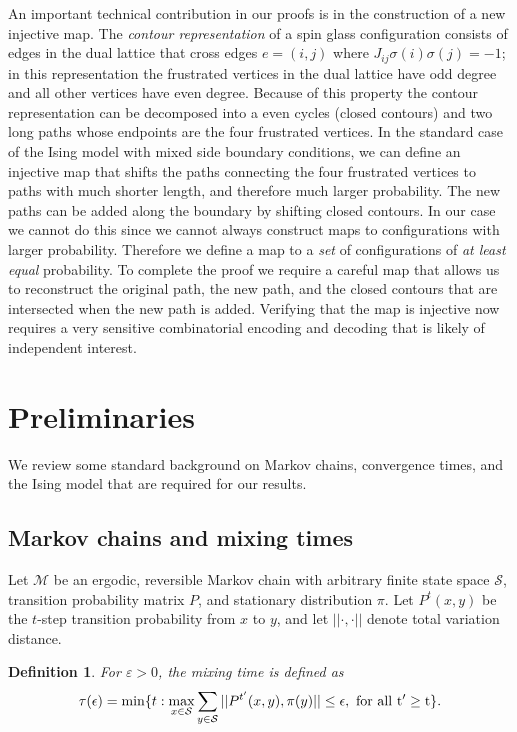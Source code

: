 \documentclass[letterpaper,english,numberwithinsect]{amsart}
\newtheorem{definition}{Definition}[section]
\newcommand{\cM}{\mathcal{M}}
\newcommand{\cS}{\mathcal{S}}
\begin{document}
An important technical contribution in our proofs is in the construction of a new injective map.  The {\it contour representation} of a spin glass configuration consists of edges in the dual lattice that cross  edges $e=(i,j)$ where $J_{ij} \sigma(i) \sigma(j) = -1$; in this representation the frustrated vertices in the dual lattice have odd degree and all other vertices have even degree. Because of this property the contour representation can be decomposed into a even cycles (closed contours) and two long paths whose endpoints are the four frustrated vertices.  In the standard case of the Ising model  with mixed side boundary conditions, we can define an injective map that shifts the paths connecting the four frustrated vertices to paths with much shorter length, and therefore much larger probability.  The new paths can be added along the boundary by shifting closed contours.  In our case we cannot do this since we cannot always construct maps to configurations with larger probability. Therefore we define a map to a {\it set} of configurations of {\it at least equal} probability.  To complete the proof we require a careful map that allows us to reconstruct the original path, the new path, and the closed contours that are intersected when the new path is added.  Verifying that the map is injective now requires a very sensitive combinatorial encoding and decoding that is likely of independent interest.

\section{Preliminaries}\label{PrelimSection}

We review some standard background on Markov chains, convergence times, and the Ising model that are required for our results.

\subsection{Markov chains and mixing times}

Let ${\cM}$ be an ergodic, 
reversible Markov chain with arbitrary finite state space $\cS$, transition
probability matrix $P$, and stationary distribution $\pi$. Let
$P^t(x,y)$ be the $t$-step transition probability from $x$ to $y$, and
let $||\cdot, \cdot||$ denote total variation distance.

\begin{definition}
For $\varepsilon > 0$, the {\em mixing time} is defined as
$$\tau(\epsilon)=\min\{t : \max_{x \in \cS}  \sum_{y\in \cS} ||P^{t'}(x,y),\pi(y)||\leq \epsilon, \ \rm{for \ all} \  t'\geq t\}.$$
\end{definition}
\end{document}
